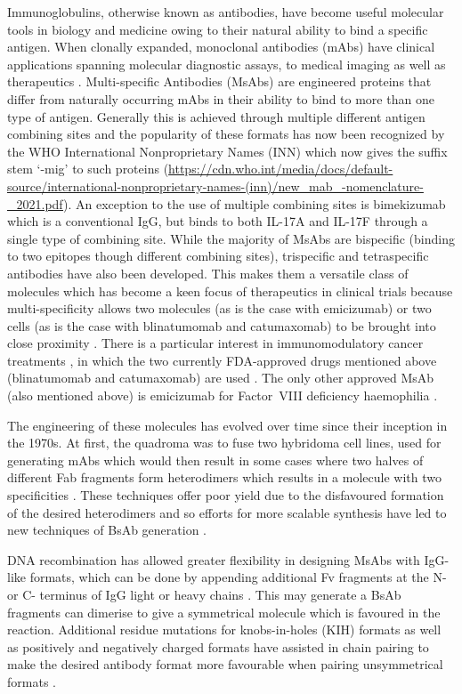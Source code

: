 \documentclass{article}
\begin{document}
Immunoglobulins, otherwise known as antibodies, have become useful molecular
tools in biology and medicine owing to their natural ability to bind a
specific antigen. When clonally expanded, monoclonal antibodies (mAbs)
have clinical applications spanning molecular diagnostic assays, to medical
imaging as well as therapeutics \cite{ma:2021}.
Multi-specific Antibodies (MsAbs) are engineered proteins
that differ from naturally occurring mAbs in their ability to bind to
more than one type of antigen. Generally this is achieved through multiple
different antigen combining sites and the popularity of these formats
has now been recognized by the WHO International Nonproprietary Names
(INN) which now gives the suffix stem `-mig' to such proteins
(\url{https://cdn.who.int/media/docs/default-source/international-nonproprietary-names-(inn)/new_mab_-nomenclature-_2021.pdf}).
An exception to the use of multiple combining sites is bimekizumab
which is a conventional IgG, but binds to both IL-17A and IL-17F
through a single type of combining site.
\cite{https://doi.org/10.3389/fimmu.2020.01894}
While the majority of MsAbs are bispecific (binding to two epitopes though
different combining sites), 
trispecific and tetraspecific antibodies have also been developed.
This makes them a versatile class of molecules
which has become a keen focus of therapeutics in clinical trials
because multi-specificity allows two molecules (as is the case with emicizumab)
or two cells (as is the case with blinatumomab and catumaxomab)
to be brought into close proximity \cite{fan:2015}.
There is a particular interest in immunomodulatory cancer treatments
\cite{labrijn:2019}, in which the two currently FDA-approved
drugs mentioned above (blinatumomab and catumaxomab) are used
\cite{wilke:2017,seimetz:2011}. The only other approved MsAb (also mentioned
above) is emicizumab for Factor~VIII deficiency haemophilia \cite{schmitt:2021}. 

The engineering of these molecules has evolved over time since their
inception in the 1970s. At first, the quadroma was to fuse two
hybridoma cell lines, used for generating mAbs which would then result
in some cases where two halves of different Fab fragments form
heterodimers which results in a molecule with two specificities
\cite{milstein:1983,kontermann:2015}. These
techniques offer poor yield due to the disfavoured formation of the
desired heterodimers and so efforts for more scalable synthesis have
led to new techniques of BsAb generation \cite{spiess:2015}. 

DNA recombination has allowed greater flexibility in designing  MsAbs
with IgG-like formats, which can be done by appending additional Fv
fragments at the N- or C- terminus of IgG light or heavy chains
\cite{brinkmann:2017}. This may generate a BsAb fragments 
can dimerise to give a symmetrical molecule which is favoured in the
reaction. Additional residue mutations for knobs-in-holes (KIH)
formats \cite{ridgway:1996} as well as positively and negatively
charged formats \cite{gunasekaran:2010} have assisted in chain
pairing to make the desired antibody format more favourable when
pairing unsymmetrical formats \cite{spiess:2015}.   
\end{document}
